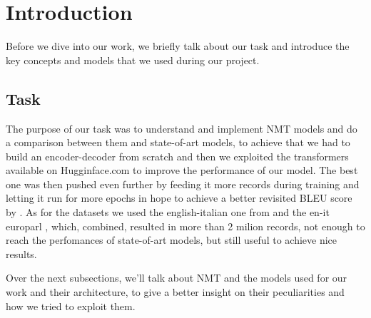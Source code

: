 \section{Introduction}
Before we dive into our work, we briefly talk about our task and introduce the key concepts and models that we used during our project.
\subsection{Task}
The purpose of our task was to understand and implement NMT models and do a comparison between them and state-of-art models, to achieve that we had to build an encoder-decoder from scratch and then we exploited the transformers available on Hugginface.com \cite{huggingface_co} to improve the performance of our model. The best one was then pushed even further by feeding it more records during training and letting it run for more epochs in hope to achieve a better revisited BLEU score by \cite{goyal2021flores}. As for the datasets we used the english-italian one from \cite{anki_dataset} and the en-it europarl \cite{koehn2005europarl}, which, combined, resulted in more than 2 milion records, not enough to reach the perfomances of state-of-art models, but still useful to achieve nice results.
\vspace{3mm}

Over the next subsections, we'll talk about NMT and the models used for our work and their architecture, to give a better insight on their peculiarities and how we tried to exploit them.

